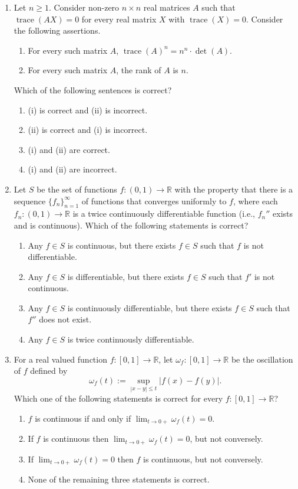 \documentclass[11pt, a4paper]{article}
\begin{document}
\begin{enumerate}
  \item Let $n \ge 1$. Consider non-zero $n \times n$ real matrices $A$ such that $\operatorname{trace}(AX) = 0$ for every real matrix $X$ with $\operatorname{trace}(X) = 0$. Consider the following assertions.
  \begin{enumerate}[label=(\roman*)]
    \item For every such matrix $A$, $\operatorname{trace}(A)^n = n^n \cdot \det(A)$.
    \item For every such matrix $A$, the rank of $A$ is $n$.
  \end{enumerate}
  Which of the following sentences is correct?
  \begin{enumerate}[label=(\alph*)]
    \item (i) is correct and (ii) is incorrect.
    \item (ii) is correct and (i) is incorrect.
    \item (i) and (ii) are correct.
    \item (i) and (ii) are incorrect.
  \end{enumerate}

  \item Let $S$ be the set of functions $f: (0,1) \to \mathbb{R}$ with the property that there is a sequence $\{f_n\}_{n=1}^\infty$ of functions that converges uniformly to $f$, where each $f_n: (0,1) \to \mathbb{R}$ is a twice continuously differentiable function (i.e., $f_n''$ exists and is continuous). Which of the following statements is correct?
  \begin{enumerate}[label=(\alph*)]
    \item Any $f \in S$ is continuous, but there exists $f \in S$ such that $f$ is not differentiable.
    \item Any $f \in S$ is differentiable, but there exists $f \in S$ such that $f'$ is not continuous.
    \item Any $f \in S$ is continuously differentiable, but there exists $f \in S$ such that $f''$ does not exist.
    \item Any $f \in S$ is twice continuously differentiable.
  \end{enumerate}

  \item For a real valued function $f: [0,1] \to \mathbb{R}$, let $\omega_f: [0,1] \to \mathbb{R}$ be the oscillation of $f$ defined by
  \[
    \omega_f(t) := \sup_{|x - y| \le t} |f(x) - f(y)|.
  \]
  Which one of the following statements is correct for every $f: [0,1] \to \mathbb{R}$?
  \begin{enumerate}[label=(\alph*)]
    \item $f$ is continuous if and only if $\lim_{t \to 0+} \omega_f(t) = 0$.
    \item If $f$ is continuous then $\lim_{t \to 0+} \omega_f(t) = 0$, but not conversely.
    \item If $\lim_{t \to 0+} \omega_f(t) = 0$ then $f$ is continuous, but not conversely.
    \item None of the remaining three statements is correct.
  \end{enumerate}


\end{enumerate}
\end{document}
